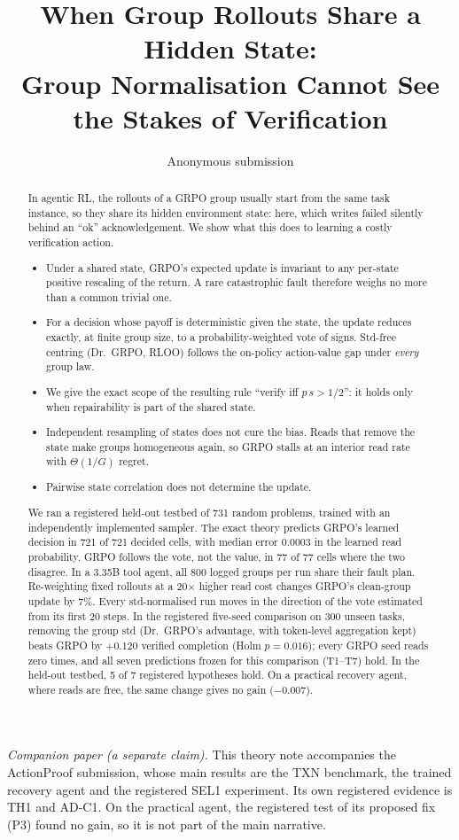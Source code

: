 \documentclass[11pt]{article}
\title{When Group Rollouts Share a Hidden State:\\Group Normalisation Cannot See the Stakes of Verification}
\author{Anonymous submission}
\begin{document}
\maketitle

\noindent\textit{Companion paper (a separate claim).} This theory note accompanies the ActionProof submission, whose main results are the TXN benchmark, the trained recovery agent and the registered SEL1 experiment. Its own registered evidence is TH1 and AD-C1. On the practical agent, the registered test of its proposed fix (P3) found no gain, so it is not part of the main narrative.

\begin{abstract}
In agentic RL, the rollouts of a GRPO group usually start from the same task instance, so they share its hidden
environment state: here, which writes failed silently behind an ``ok'' acknowledgement. We show what this does to
learning a costly verification action.
\begin{itemize}
\item Under a shared state, GRPO's expected update is invariant to any per-state positive rescaling of the return.
A rare catastrophic fault therefore weighs no more than a common trivial one.
\item For a decision whose payoff is deterministic given the state, the update reduces exactly, at finite group size,
to a probability-weighted vote of signs. Std-free centring (Dr.~GRPO, RLOO) follows the on-policy action-value gap
under \emph{every} group law.
\item We give the exact scope of the resulting rule ``verify iff $p\,s>1/2$'': it holds only when repairability is
part of the shared state.
\item Independent resampling of states does not cure the bias. Reads that remove the state make groups homogeneous
again, so GRPO stalls at an interior read rate with $\Theta(1/G)$ regret.
\item Pairwise state correlation does not determine the update.
\end{itemize}
We ran a registered held-out testbed of 731 random problems, trained with an independently implemented sampler.
The exact theory predicts GRPO's learned decision in 721 of 721 decided cells, with median error 0.0003 in the
learned read probability. GRPO follows the vote, not the value, in 77 of 77 cells where the two disagree. In a 3.35B tool agent, all 800 logged groups per run share their fault plan. Re-weighting fixed
rollouts at a 20$\times$ higher read cost changes GRPO's clean-group update by 7\%. Every std-normalised run moves in
the direction of the vote estimated from its first 20 steps. In the registered five-seed comparison on 300 unseen tasks, removing the group std (Dr.~GRPO's advantage, with token-level aggregation kept) beats GRPO by $+0.120$ verified
completion (Holm $p=0.016$); every GRPO seed reads zero times, and all seven predictions frozen for this comparison
(T1--T7) hold. In the held-out testbed, 5 of 7 registered hypotheses hold. On a practical recovery agent, where reads
are free, the same change gives no gain ($-0.007$).
\end{abstract}
\end{document}
